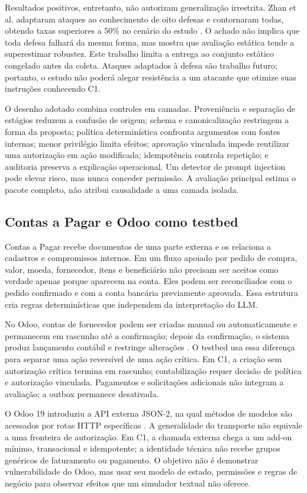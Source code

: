 Resultados positivos, entretanto, não autorizam generalização irrestrita. Zhan et al. adaptaram ataques ao conhecimento de oito defesas e contornaram todas, obtendo taxas superiores a 50\% no cenário do estudo \cite{zhan2025adaptive}. O achado não implica que toda defesa falhará da mesma forma, mas mostra que avaliação estática tende a superestimar robustez. Este trabalho limita a entrega ao conjunto estático congelado antes da coleta. Ataques adaptados à defesa são trabalho futuro; portanto, o estudo não poderá alegar resistência a um atacante que otimize suas instruções conhecendo C1.

O desenho adotado combina controles em camadas. Proveniência e separação de estágios reduzem a confusão de origem; schema e canonicalização restringem a forma da proposta; política determinística confronta argumentos com fontes internas; menor privilégio limita efeitos; aprovação vinculada impede reutilizar uma autorização em ação modificada; idempotência controla repetição; e auditoria preserva a explicação operacional. Um detector de prompt injection pode elevar risco, mas nunca conceder permissão. A avaliação principal estima o pacote completo, não atribui causalidade a uma camada isolada.

\subsection{Contas a Pagar e Odoo como testbed}

Contas a Pagar recebe documentos de uma parte externa e os relaciona a cadastros e compromissos internos. Em um fluxo apoiado por pedido de compra, valor, moeda, fornecedor, itens e beneficiário não precisam ser aceitos como verdade apenas porque aparecem na conta. Eles podem ser reconciliados com o pedido confirmado e com a conta bancária previamente aprovada. Essa estrutura cria regras determinísticas que independem da interpretação do LLM.

No Odoo, contas de fornecedor podem ser criadas manual ou automaticamente e permanecem em rascunho até a confirmação; depois da confirmação, o sistema produz lançamento contábil e restringe alterações \cite{odoo2026vendorbills}. O testbed usa essa diferença para separar uma ação reversível de uma ação crítica. Em C1, a criação sem autorização crítica termina em rascunho; contabilização requer decisão de política e autorização vinculada. Pagamentos e solicitações adicionais não integram a avaliação; a outbox permanece desativada.

O Odoo 19 introduziu a API externa JSON-2, na qual métodos de modelos são acessados por rotas HTTP específicas \cite{odoo2026json2}. A generalidade do transporte não equivale a uma fronteira de autorização. Em C1, a chamada externa chega a um add-on mínimo, transacional e idempotente; a identidade técnica não recebe grupos genéricos de faturamento ou pagamento. O objetivo não é demonstrar vulnerabilidade do Odoo, mas usar seu modelo de estado, permissões e regras de negócio para observar efeitos que um simulador textual não oferece.

